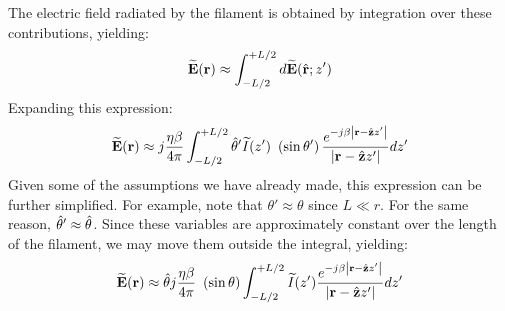 The electric field radiated by the filament is obtained by integration over these contributions, yielding:
%
\begin{equation}
\widetilde{\bf E}({\bf r}) \approx \int_{-L/2}^{+L/2} d\widetilde{\bf E}(\hat{\bf r};z') 
\end{equation}
%
Expanding this expression:
%
\begin{equation}
\widetilde{\bf E}({\bf r}) \approx 
 j \frac{\eta\beta}{4\pi} \int_{-L/2}^{+L/2} \hat{\bf \theta}' \widetilde{I}(z')~\left(\sin\theta'\right) \frac{e^{-j\beta \left|{\bf r}-\hat{\bf z}z'\right|}}{\left|{\bf r}-\hat{\bf z}z'\right|} dz'
\end{equation}
%
Given some of the assumptions we have already made, this expression can be further simplified.
For example, note that $\theta'\approx\theta$ since $L\ll r$.
For the same reason, $\hat{\bf \theta}'\approx\hat{\bf \theta}$.
Since these variables are approximately constant over the length of the filament, we may move them outside the integral, yielding:
%
\begin{equation}
\widetilde{\bf E}({\bf r}) \approx \hat{\bf \theta} j \frac{\eta\beta}{4\pi}~\left(\sin\theta\right) \int_{-L/2}^{+L/2} \widetilde{I}(z') \frac{e^{-j\beta \left|{\bf r}-\hat{\bf z}z'\right|}}{\left|{\bf r}-\hat{\bf z}z'\right|} dz'
\label{m0199_eE1}
\end{equation}

